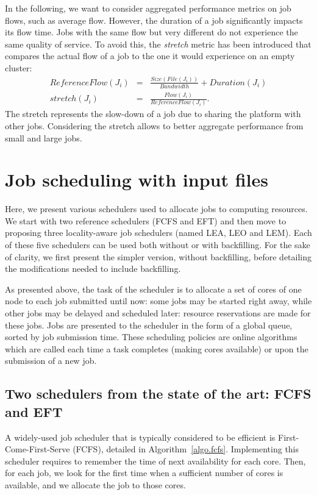 \documentclass[conference]{IEEEtran}
\newcommand{\file}{\ensuremath{\mathit{File}}\xspace}
\newcommand{\size}{\ensuremath{\mathit{Size}}\xspace}
\newcommand{\duration}{\mathit{Duration}\xspace}
\newcommand{\bandwidth}{\mathit{Bandwidth}\xspace}
\newcommand{\emptyflow}{\mathit{ReferenceFlow}\xspace}
\newcommand{\rev}[1]{{\color{black}{#1}}}
\begin{document}
In the following, we want to consider aggregated performance metrics on
job flows, such as average flow. However, the duration
of a job significantly impacts its flow time. Jobs with the same
flow but very different \rev{durations} do not experience the same quality
of service. To avoid this, the \emph{stretch} metric has been
introduced that compares the actual flow of a job to the one it would
experience on an empty cluster:
\begin{eqnarray*}
\emptyflow(J_i) &=& \frac{\size(\file(J_i))}{\bandwidth} + \duration(J_i)\\
\mathit{stretch}(J_i) &=& \frac{\mathit{Flow}(J_i)}{\emptyflow(J_i)}.
\end{eqnarray*}
The stretch represents the slow-down of a job due to sharing the
platform with other jobs. Considering the stretch
allows to better aggregate performance from small and large jobs.


\section{Job scheduling with input files}\label{sec.schedulers}


Here, we present various schedulers used to allocate jobs to
computing resources. We start with two reference schedulers (FCFS and EFT)
and then move to proposing three locality-aware job schedulers (named
LEA, LEO and LEM). Each of these five schedulers can be used both
without or with backfilling. For the sake of clarity, we first present
the simpler version, without backfilling, before detailing the
modifications needed to include backfilling.

As presented above, the task of the scheduler is to allocate a set of
cores of one node
to each job submitted until now: some jobs may be started right away,
while other jobs may be delayed and scheduled later: resource
reservations are made for these jobs. Jobs are presented to the
scheduler in the form of a global queue, sorted by job submission
time. These scheduling policies are online algorithms which are called each time
a task completes (making cores available) or upon the submission of
a new job.

\subsection{Two schedulers from the state of the art: FCFS and EFT}\label{subsec.fcfs_eft}

A widely-used job scheduler that is typically considered to be efficient is
First-Come-First-Serve (FCFS), detailed in
Algorithm~\ref{algo.fcfs}. Implementing this scheduler requires to
remember the time of next availability for each core. Then, for each job, we look
for the first time when a sufficient number of cores is available, and we allocate the job to
those cores.
\end{document}
